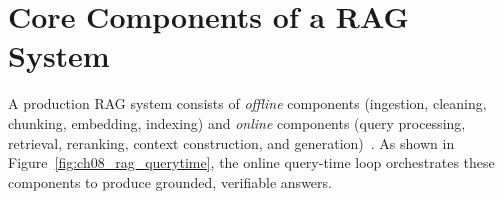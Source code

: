 \section{Core Components of a RAG System}
\label{sec:rag-core-components-of-a-rag-system}
A production RAG system consists of \emph{offline} components (ingestion, cleaning, chunking, embedding, indexing) and \emph{online} components (query processing, retrieval, reranking, context construction, and generation)~\cite{Pinecone2023RAG}. As shown in Figure~\ref{fig:ch08_rag_querytime}, the online query-time loop orchestrates these components to produce grounded, verifiable answers.

